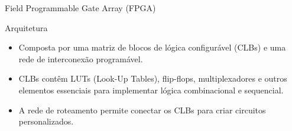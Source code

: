 \documentclass[aspectratio=169]{beamer}
\begin{document}
\begin{frame}{Field Programmable Gate Array (FPGA)}
	\justifying
	
	
%	
%		
%	
%	
%		
	
	
	\begin{block}{Arquitetura}
		\justifying
		\begin{itemize}
			\item Composta por uma matriz de blocos de lógica configurável (CLBs) e uma rede de interconexão programável.
			\item CLBs contêm LUTs (Look-Up Tables), flip-flops, multiplexadores e outros elementos essenciais para implementar lógica combinacional e sequencial.
			\item A rede de roteamento permite conectar os CLBs para criar circuitos personalizados.
		\end{itemize}
		
	\end{block}	
	
	
	
	
	
	
\end{frame}
\end{document}

